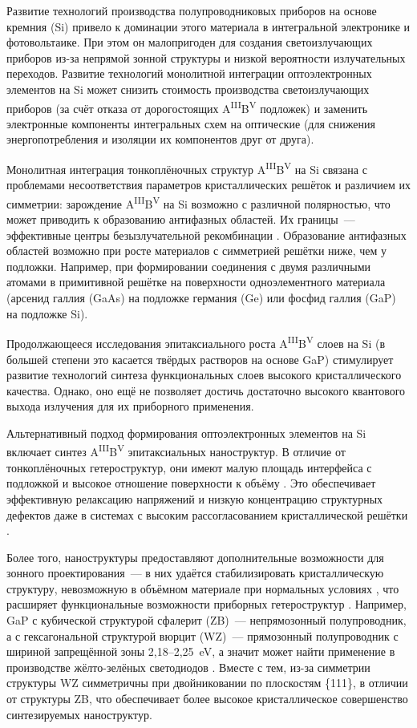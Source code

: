 {\actuality} Развитие технологий производства полупроводниковых приборов на
основе кремния (Si) привело к  доминации этого материала в интегральной
электронике и фотовольтаике. При этом он малопригоден для создания
светоизлучающих приборов из-за непрямой зонной структуры и низкой вероятности
излучательных переходов. Развитие технологий монолитной интеграции
оптоэлектронных элементов на Si может снизить стоимость производства
светоизлучающих приборов (за счёт отказа от дорогостоящих
A\textsuperscript{III}B\textsuperscript{V} подложек) и заменить электронные
компоненты интегральных схем на оптические (для снижения энергопотребления и
изоляции их компонентов друг от друга).

Монолитная интеграция тонкоплёночных структур
A\textsuperscript{III}B\textsuperscript{V} на Si связана с проблемами
несоответствия параметров кристаллических решёток и различием их симметрии:
зарождение A\textsuperscript{III}B\textsuperscript{V} на Si возможно с
различной полярностью, что может приводить к образованию антифазных областей.
Их границы~--- эффективные центры безызлучательной рекомбинации
\cite{Takagi1998}. Образование антифазных областей возможно при росте
материалов с симметрией решётки ниже, чем у подложки. Например, при
формировании соединения с двумя различными атомами в примитивной решётке на
поверхности одноэлементного материала (арсенид галлия (GaAs) на подложке
германия (Ge) или фосфид галлия (GaP) на подложке Si).

Продолжающееся исследования эпитаксиального роста
A\textsuperscript{III}B\textsuperscript{V} слоев на Si (в большей степени это
касается твёрдых растворов на основе GaP) стимулирует развитие технологий
синтеза функциональных слоев высокого кристаллического качества. Однако, оно
ещё не позволяет достичь достаточно высокого квантового выхода излучения для их
приборного применения.

Альтернативный подход формирования оптоэлектронных элементов на Si включает
синтез A\textsuperscript{III}B\textsuperscript{V} эпитаксиальных наноструктур.
В отличие от тонкоплёночных гетероструктур, они имеют малую площадь интерфейса
с подложкой и высокое отношение поверхности к объёму \cite{Bolshakov2013,
Tchernycheva2007}. Это обеспечивает эффективную релаксацию напряжений и низкую
концентрацию структурных дефектов даже в системах с высоким рассогласованием
кристаллической решётки \cite{Samsonenko2011}.

Более того, наноструктуры предоставляют дополнительные возможности для зонного
проектирования~--- в них удаётся стабилизировать кристаллическую структуру,
невозможную в объёмном материале при нормальных условиях \cite{Mohseni2009},
что расширяет функциональные возможности приборных гетероструктур
\cite{Spirkoska2009}. Например, GaP с кубической структурой сфалерит (ZB)~---
непрямозонный полупроводник, а с гексагональной структурой вюрцит (WZ)~---
прямозонный полупроводник с шириной запрещённой зоны
2,18--2,25~\si{\electronvolt}, а значит может найти применение в производстве
жёлто-зелёных светодиодов \cite{Assali2013}. Вместе с тем, из-за симметрии
структуры WZ симметричны при двойниковании по плоскостям \{111\}, в отличии от
структуры ZB, что обеспечивает более высокое кристаллическое совершенство
синтезируемых наноструктур.

